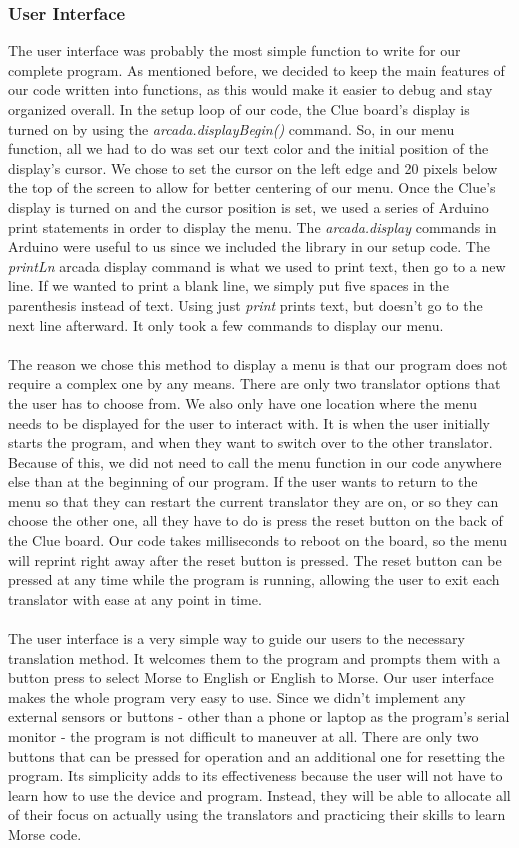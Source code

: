 \documentclass[12pt]{article}
\begin{document}
\subsubsection{User Interface}
The user interface was probably the most simple function to write for our complete program. As mentioned before, we decided to keep the main features of our code written into functions, as this would make it easier to debug and stay organized overall. In the setup loop of our code, the Clue board's display is turned on by using the \emph{arcada.displayBegin()} command. So, in our menu function, all we had to do was set our text color and the initial position of the display's cursor. We chose to set the cursor on the left edge and 20 pixels below the top of the screen to allow for better centering of our menu. Once the Clue's display is turned on and the cursor position is set, we used a series of Arduino print statements in order to display the menu. The \emph{arcada.display} commands in Arduino were useful to us since we included the library in our setup code. The \emph{printLn} arcada display command is what we used to print text, then go to a new line. If we wanted to print a blank line, we simply put five spaces in the parenthesis instead of text. Using just \emph{print} prints text, but doesn't go to the next line afterward. It only took a few commands to display our menu.\\
\\
The reason we chose this method to display a menu is that our program does not require a complex one by any means. There are only two translator options that the user has to choose from. We also only have one location where the menu needs to be displayed for the user to interact with. It is when the user initially starts the program, and when they want to switch over to the other translator. Because of this, we did not need to call the menu function in our code anywhere else than at the beginning of our program. If the user wants to return to the menu so that they can restart the current translator they are on, or so they can choose the other one, all they have to do is press the reset button on the back of the Clue board. Our code takes milliseconds to reboot on the board, so the menu will reprint right away after the reset button is pressed. The reset button can be pressed at any time while the program is running, allowing the user to exit each translator with ease at any point in time.\\
\\
The user interface is a very simple way to guide our users to the necessary translation method. It welcomes them to the program and prompts them with a button press to select Morse to English or English to Morse. Our user interface makes the whole program very easy to use. Since we didn't implement any external sensors or buttons - other than a phone or laptop as the program's serial monitor - the program is not difficult to maneuver at all. There are only two buttons that can be pressed for operation and an additional one for resetting the program. Its simplicity adds to its effectiveness because the user will not have to learn how to use the device and program. Instead, they will be able to allocate all of their focus on actually using the translators and practicing their skills to learn Morse code.
\FloatBarrier
\end{document}
